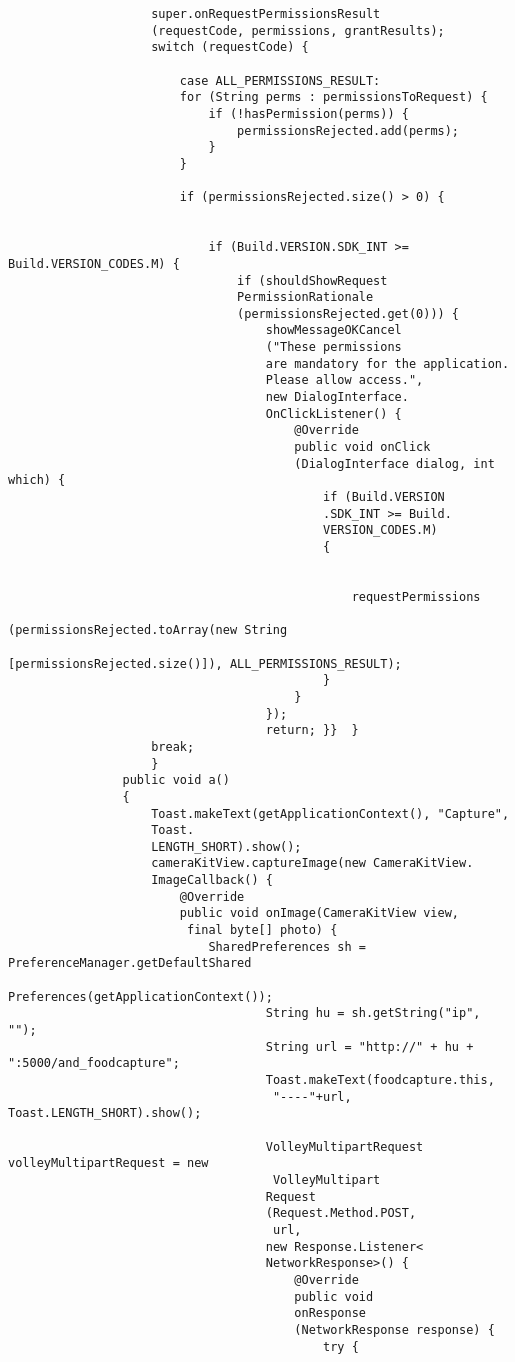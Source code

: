 \documentclass[a4paper,12pt,toc=flat]{report}
\begin{document}
{{{{\begin{itemize}
\begin{verbatim}
 					super.onRequestPermissionsResult
 					(requestCode, permissions, grantResults);
 					switch (requestCode) {
 						
 						case ALL_PERMISSIONS_RESULT:
 						for (String perms : permissionsToRequest) {
 							if (!hasPermission(perms)) {
 								permissionsRejected.add(perms);
 							}
 						}
 						
 						if (permissionsRejected.size() > 0) {
 							
 							
 							if (Build.VERSION.SDK_INT >= Build.VERSION_CODES.M) {
 								if (shouldShowRequest
 								PermissionRationale
 								(permissionsRejected.get(0))) {
 									showMessageOKCancel
 									("These permissions 
 									are mandatory for the application. 
 									Please allow access.",
 									new DialogInterface.
 									OnClickListener() {
 										@Override
 										public void onClick
 										(DialogInterface dialog, int which) {
 											if (Build.VERSION
 											.SDK_INT >= Build.
 											VERSION_CODES.M) 
 											{
 												
 												
 												requestPermissions
 												(permissionsRejected.toArray(new String
 												[permissionsRejected.size()]), ALL_PERMISSIONS_RESULT);
 											}
 										}
 									});
 									return;	}}	}
 					break;
 					}
 				public void a()
 				{
 					Toast.makeText(getApplicationContext(), "Capture", 
 					Toast.
 					LENGTH_SHORT).show();
 					cameraKitView.captureImage(new CameraKitView.
 					ImageCallback() {
 						@Override
 						public void onImage(CameraKitView view,
 						 final byte[] photo) {
 							SharedPreferences sh = PreferenceManager.getDefaultShared
 									Preferences(getApplicationContext());
 									String hu = sh.getString("ip", "");
 									String url = "http://" + hu + ":5000/and_foodcapture";
 									Toast.makeText(foodcapture.this,
 									 "----"+url, Toast.LENGTH_SHORT).show();
 									
 									VolleyMultipartRequest volleyMultipartRequest = new
 									 VolleyMultipart
 									Request
 									(Request.Method.POST,
 									 url,
 									new Response.Listener<
 									NetworkResponse>() {
 										@Override
 										public void 
 										onResponse
 										(NetworkResponse response) {
 											try {
 												

\end{verbatim}
\end{itemize}}}}}
\end{document}
